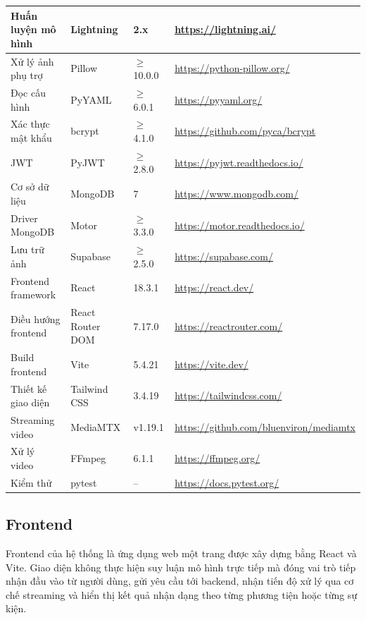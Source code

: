 \documentclass[../DoAn.tex]{subfiles}
\begin{document}
\begin{longtable}{p{3.2cm} p{4.2cm} p{2.6cm} p{4.8cm}}
Huấn luyện mô hình & Lightning & 2.x & \url{https://lightning.ai/} \\ \hline
Xử lý ảnh phụ trợ & Pillow & $\geq$ 10.0.0 & \url{https://python-pillow.org/} \\ \hline
Đọc cấu hình & PyYAML & $\geq$ 6.0.1 & \url{https://pyyaml.org/} \\ \hline
Xác thực mật khẩu & bcrypt & $\geq$ 4.1.0 & \url{https://github.com/pyca/bcrypt} \\ \hline
JWT & PyJWT & $\geq$ 2.8.0 & \url{https://pyjwt.readthedocs.io/} \\ \hline
Cơ sở dữ liệu & MongoDB & 7 & \url{https://www.mongodb.com/} \\ \hline
Driver MongoDB & Motor & $\geq$ 3.3.0 & \url{https://motor.readthedocs.io/} \\ \hline
Lưu trữ ảnh & Supabase & $\geq$ 2.5.0 & \url{https://supabase.com/} \\ \hline
Frontend framework & React & 18.3.1 & \url{https://react.dev/} \\ \hline
Điều hướng frontend & React Router DOM & 7.17.0 & \url{https://reactrouter.com/} \\ \hline
Build frontend & Vite & 5.4.21 & \url{https://vite.dev/} \\ \hline
Thiết kế giao diện & Tailwind CSS & 3.4.19 & \url{https://tailwindcss.com/} \\ \hline
Streaming video & MediaMTX & v1.19.1 & \url{https://github.com/bluenviron/mediamtx} \\ \hline
Xử lý video & FFmpeg & 6.1.1 & \url{https://ffmpeg.org/} \\ \hline
Kiểm thử & pytest & -- & \url{https://docs.pytest.org/} \\ \hline

\end{longtable}

\subsection{Frontend}
\label{subsection:4.2.5}

Frontend của hệ thống là ứng dụng web một trang được xây dựng bằng React và Vite. Giao diện không thực hiện suy luận mô hình trực tiếp mà đóng vai trò tiếp nhận đầu vào từ người dùng, gửi yêu cầu tới backend, nhận tiến độ xử lý qua cơ chế streaming và hiển thị kết quả nhận dạng theo từng phương tiện hoặc từng sự kiện.
\end{document}
